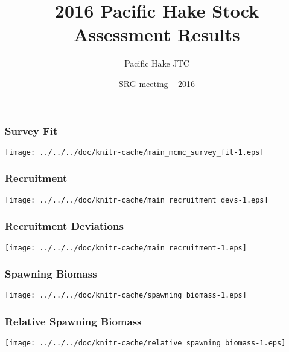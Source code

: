 \documentclass[aspectratio=169]{beamer}
\title[Hake Data]{2016 Pacific Hake Stock Assessment Results}
\author[Hicks]{Pacific Hake JTC}
\date{{\footnotesize SRG meeting -- 2016}}
\begin{document}
\frame[plain]{
\titlepage
}

\begin{frame}
\frametitle{Survey Fit}
    \begin{center}
        \hspace{0.5in}
        \texttt{[image: ../../../doc/knitr-cache/main\_mcmc\_survey\_fit-1.eps]}
    \end{center}
\end{frame}





\begin{frame}
\frametitle{Recruitment}
    \begin{center}
        \hspace{0.5in}
        \texttt{[image: ../../../doc/knitr-cache/main\_recruitment\_devs-1.eps]}
    \end{center}
\end{frame}

\begin{frame}
\frametitle{Recruitment Deviations}
    \begin{center}
        \hspace{0.5in}
        \texttt{[image: ../../../doc/knitr-cache/main\_recruitment-1.eps]}
    \end{center}
\end{frame}

\begin{frame}
\frametitle{Spawning Biomass}
    \begin{center}
        \hspace{0.5in}
        \texttt{[image: ../../../doc/knitr-cache/spawning\_biomass-1.eps]}
    \end{center}
\end{frame}

\begin{frame}
\frametitle{Relative Spawning Biomass}
    \begin{center}
        \hspace{0.5in}
        \texttt{[image: ../../../doc/knitr-cache/relative\_spawning\_biomass-1.eps]}
    \end{center}
\end{frame}
\end{document}
